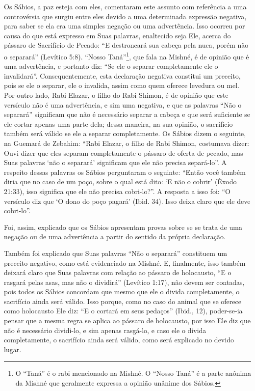 Os Sábios, a paz esteja com eles, comentaram este assunto com
referência a uma controvérsia que surgiu entre eles devido a uma
determinada expressão negativa, para saber se ela era uma simples
negação ou uma advertência. Isso ocorreu por causa do que está expresso
em Suas palavras, enaltecido seja Ele, acerca do pássaro de Sacrifício
de Pecado: ``E destroncará sua cabeça pela nuca, porém não o separará''
(Levítico 5:8). ``Nosso Taná''\footnote{O ``Taná'' é o rabi mencionado na Mishné. O ``Nosso Taná'' é a
parte anônima da Mishné que geralmente expressa a opinião unânime dos
Sábios.}, que fala na Mishné,
é de opinião que é uma advertência, e portanto diz: ``Se ele o separar
completamente ele o invalidará''. Consequentemente, esta declaração
negativa constitui um preceito, pois se ele o separar, ele o invalida,
assim como quem oferece levedura ou mel. Por outro lado, Rabi Elazar, o
filho do Rabi Shimon, é de opinião que este versículo não é uma
advertência, e sim uma negativa, e que as palavras ``Não o separará''
significam que não é necessário separar a cabeça e que será suficiente
se ele cortar apenas uma parte dela; dessa maneira, na sua opinião, o
sacrifício também será válido se ele a separar completamente. Os Sábios
dizem o seguinte, na Guemará de Zebahim: ``Rabi Elazar, o filho de Rabi
Shimon, costumava dizer: Ouvi dizer que eles separam completamente o
pássaro de oferta de pecado, mas Suas palavras `não o separará'
significam que ele não precisa separá-lo''. A respeito dessas palavras
os Sábios perguntaram o seguinte: ``Então você também diria que no caso
de um poço, sobre o qual está
dito: `E não o cobrir' (Êxodo 21:33), isso significa que ele não precisa
cobri-lo?''. A resposta a isso foi: ``O versículo diz que `O dono do
poço pagará' (Ibid. 34). Isso deixa claro que ele deve cobri-lo''.

Foi, assim, explicado que os Sábios apresentam provas sobre se se trata
de uma negação ou de uma advertência a partir do sentido da própria
declaração.

Também foi explicado que Suas palavras ``Não o separará'' constituem um
preceito negativo, como está evidenciado na Mishné. E, finalmente, isso
também deixará claro que Suas palavras com relação ao pássaro de
holocausto, ``E o rasgará pelas asas, mas não o dividirá'' (Levítico
1:17), não devem ser contadas, pois todos os Sábios concordam que mesmo
que ele o divida completamente, o sacrifício ainda será válido. Isso
porque, como no caso do animal que se oferece como holocausto Ele diz:
``E o cortará em seus pedaços'' (Ibid., 12), poder-se-ia pensar que a
mesma regra se aplica ao pássaro de holocausto, por isso Ele diz que
não é necessário dividi-lo, e sim apenas rasgá-lo, e caso ele o divida
completamente, o sacrifício ainda será válido, como será explicado no
devido lugar.


